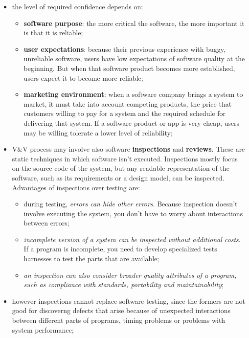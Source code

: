 \documentclass[oneside]{article}
\begin{document}
\begin{itemize}
    \item the level of required confidence depends on:
        \begin{itemize}
            \item \textbf{software purpose}: the more critical the software, the more important it is that it is reliable;
            \item \textbf{user expectations}: because their previous experience with buggy, unreliable software, users have low expectations of software quality at the beginning. But when that software product becomes more established, users expect it to become more reliable;
            \item \textbf{marketing environment}: when a software company brings a system to market, it must take into account competing products, the price that customers willing to pay for a system and the required schedule for delivering that system. If a software product or app is very cheap, users may be willing tolerate a lower level of reliability;
        \end{itemize}
        
    \item V\&V process may involve also software \textbf{inspections} and \textbf{reviews}. These are static techniques in which software isn't executed. Inspections mostly focus on the source code of the system, but any readable representation of the software, such as its requirements or a design model, can be inspected. Advantages of inspections over testing are:
        \begin{itemize}
            \item during testing, \textit{errors can hide other errors}. Because inspection doesn't involve executing the system, you don't have to worry about interactions between errors;
            \item \textit{incomplete version of a system can be inspected without additional costs}. If a program is incomplete, you need to develop specialized tests harnesses to test the parts that are available;
            \item \textit{an inspection can also consider broader quality attributes of a program, such as compliance with standards, portability and maintainability};
        \end{itemize}
        
    \item however inspections cannot replace software testing, since the formers are not good for discoverng defects that arise because of unexpected interactions between different parts of programs, timing problems or problems with system performance;
    

\end{itemize}
\end{document}
